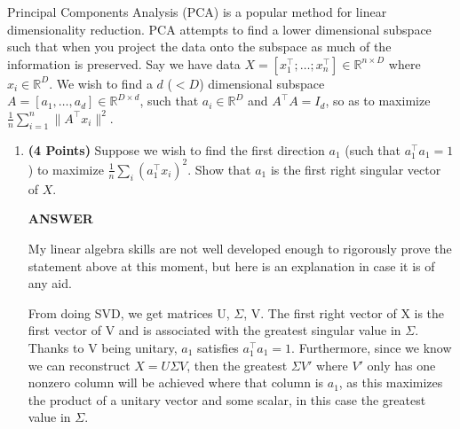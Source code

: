 \documentclass[a4paper]{article}
\theoremstyle{definition}
\newcommand{\RR}{\mathbb{R}}
\begin{document}
Principal Components Analysis (PCA) is a popular method for linear dimensionality reduction. PCA attempts to find a lower dimensional subspace such that when you project the data onto the subspace as much of the information is preserved. Say we have data $X = [x_1^\top; \dots; x_n^\top] \in \RR^{n\times D}$ where  $x_i \in \RR^D$. We wish to find a $d$ ($ < D$) dimensional subspace $A = [a_1, \dots, a_d] \in \RR^{D\times d}$, such that $ a_i \in \RR^D$ and $A^\top A = I_d$, so as to maximize $\frac{1}{n} \sum_{i=1}^n \|A^\top x_i\|^2$.
\begin{enumerate}

\item  \textbf{(4 Points)}
Suppose we wish to find the first direction $a_1$ (such that $a_1^\top a_1 = 1$) to maximize $\frac{1}{n} \sum_i (a_1^\top x_i)^2$.
Show that $a_1$ is the first right singular vector of $X$.

\textbf{ANSWER}

My linear algebra skills are not well developed enough to rigorously prove the statement above at this moment, but here is an explanation in case it is of any aid.

From doing SVD, we get matrices U, $\Sigma$, V. The first right vector of X is the first vector of V and is associated with the greatest singular value in $\Sigma$. Thanks to V being unitary, $a_1$ satisfies $a_1^\top a_1 = 1$. Furthermore, since we know we can reconstruct $X = U \Sigma V$, then the greatest $\Sigma V'$ where $V'$ only has one nonzero column will be achieved where that column is $a_1$, as this maximizes the product of a unitary vector and some scalar, in this case the greatest value in $\Sigma$.








\end{enumerate}
\end{document}
